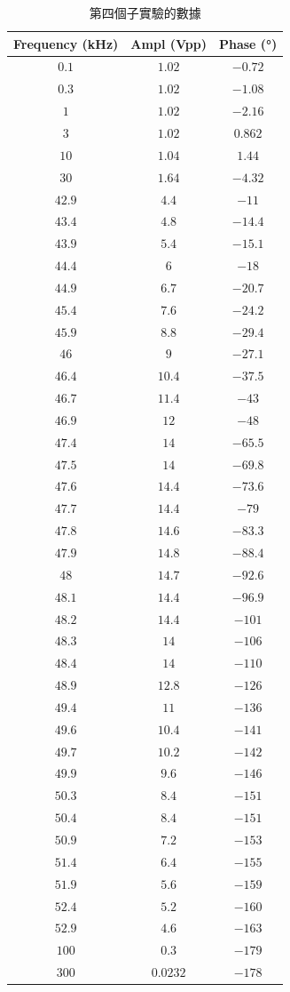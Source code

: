 \begin{table}[htb!]
\centering
\caption{第四個子實驗的數據}
\begin{tabular}{ccc}
\toprule
Frequency (\unit{\kHz}) & Ampl (Vpp) & Phase (\unit{\degree}) \\
\midrule
$0.1$ & $1.02$ & $-0.72$ \\
$0.3$ & $1.02$ & $-1.08$ \\
$1$ & $1.02$ & $-2.16$ \\
$3$ & $1.02$ & $0.862$ \\
$10$ & $1.04$ & $1.44$ \\
$30$ & $1.64$ & $-4.32$ \\
$42.9$ & $4.4$ & $-11$ \\
$43.4$ & $4.8$ & $-14.4$ \\
$43.9$ & $5.4$ & $-15.1$ \\
$44.4$ & $6$ & $-18$ \\
$44.9$ & $6.7$ & $-20.7$ \\
$45.4$ & $7.6$ & $-24.2$ \\
$45.9$ & $8.8$ & $-29.4$ \\
$46$ & $9$ & $-27.1$ \\
$46.4$ & $10.4$ & $-37.5$ \\
$46.7$ & $11.4$ & $-43$ \\
$46.9$ & $12$ & $-48$ \\
$47.4$ & $14$ & $-65.5$ \\
$47.5$ & $14$ & $-69.8$ \\
$47.6$ & $14.4$ & $-73.6$ \\
$47.7$ & $14.4$ & $-79$ \\
$47.8$ & $14.6$ & $-83.3$ \\
$47.9$ & $14.8$ & $-88.4$ \\
$48$ & $14.7$ & $-92.6$ \\
$48.1$ & $14.4$ & $-96.9$ \\
$48.2$ & $14.4$ & $-101$ \\
$48.3$ & $14$ & $-106$ \\
$48.4$ & $14$ & $-110$ \\
$48.9$ & $12.8$ & $-126$ \\
$49.4$ & $11$ & $-136$ \\
$49.6$ & $10.4$ & $-141$ \\
$49.7$ & $10.2$ & $-142$ \\
$49.9$ & $9.6$ & $-146$ \\
$50.3$ & $8.4$ & $-151$ \\
$50.4$ & $8.4$ & $-151$ \\
$50.9$ & $7.2$ & $-153$ \\
$51.4$ & $6.4$ & $-155$ \\
$51.9$ & $5.6$ & $-159$ \\
$52.4$ & $5.2$ & $-160$ \\
$52.9$ & $4.6$ & $-163$ \\
$100$ & $0.3$ & $-179$ \\
$300$ & $0.0232$ & $-178$ \\
\bottomrule
\end{tabular}
\end{table}

